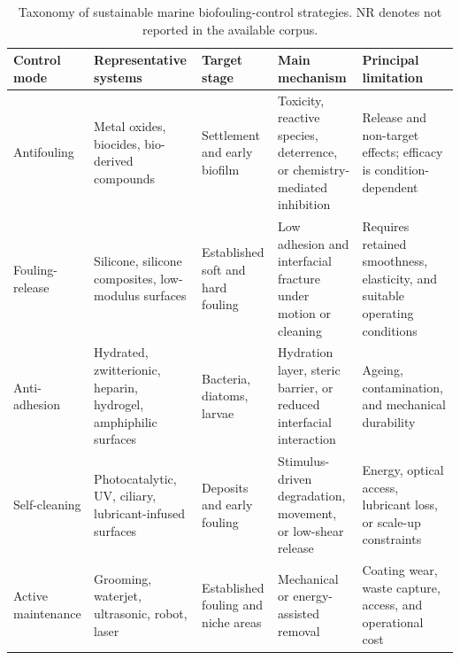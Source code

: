 \begin{table}[t]
\centering
\caption{Taxonomy of sustainable marine biofouling-control strategies. NR denotes not reported in the available corpus.}
\label{tab:taxonomy}
\small
\begin{tabularx}{\textwidth}{l l l X X}
\toprule
Control mode & Representative systems & Target stage & Main mechanism & Principal limitation \\
\midrule
Antifouling & Metal oxides, biocides, bio-derived compounds & Settlement and early biofilm & Toxicity, reactive species, deterrence, or chemistry-mediated inhibition & Release and non-target effects; efficacy is condition-dependent \\
Fouling-release & Silicone, silicone composites, low-modulus surfaces & Established soft and hard fouling & Low adhesion and interfacial fracture under motion or cleaning & Requires retained smoothness, elasticity, and suitable operating conditions \\
Anti-adhesion & Hydrated, zwitterionic, heparin, hydrogel, amphiphilic surfaces & Bacteria, diatoms, larvae & Hydration layer, steric barrier, or reduced interfacial interaction & Ageing, contamination, and mechanical durability \\
Self-cleaning & Photocatalytic, UV, ciliary, lubricant-infused surfaces & Deposits and early fouling & Stimulus-driven degradation, movement, or low-shear release & Energy, optical access, lubricant loss, or scale-up constraints \\
Active maintenance & Grooming, waterjet, ultrasonic, robot, laser & Established fouling and niche areas & Mechanical or energy-assisted removal & Coating wear, waste capture, access, and operational cost \\
\bottomrule
\end{tabularx}
\end{table}
